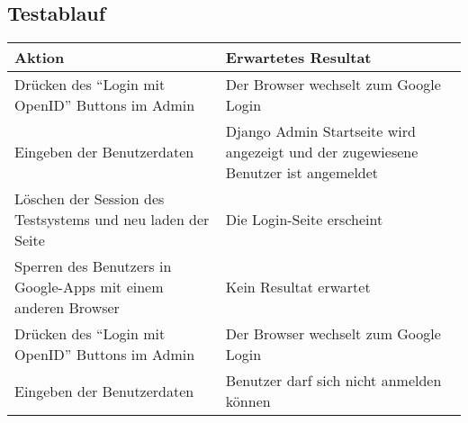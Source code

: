 \subsection{Testablauf}
\label{sub:testablauf}
\begin{tabular}{p{7cm} p{7cm}}
Aktion & Erwartetes Resultat\\
\hline
Drücken des ``Login mit OpenID'' Buttons im Admin & Der Browser wechselt zum Google Login\\
Eingeben der Benutzerdaten & Django Admin Startseite wird angezeigt und der zugewiesene Benutzer ist angemeldet\\
Löschen der Session des Testsystems und neu laden der Seite & Die Login-Seite erscheint\\
Sperren des Benutzers in Google-Apps mit einem anderen Browser & Kein Resultat erwartet\\
Drücken des ``Login mit OpenID'' Buttons im Admin & Der Browser wechselt zum Google Login\\
Eingeben der Benutzerdaten & Benutzer darf sich nicht anmelden können\\
\end{tabular}
